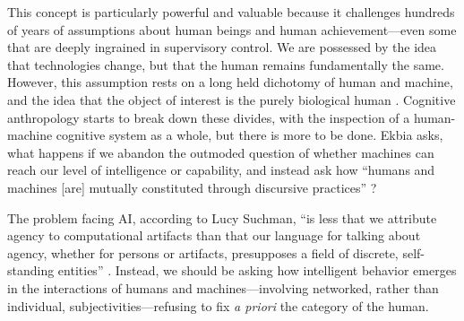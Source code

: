 
This concept is particularly powerful and valuable because it
challenges hundreds of years of assumptions about human beings and
human achievement---even some that are deeply ingrained in supervisory
control. We are
possessed by the idea that technologies change, but that the human
remains fundamentally the same. However, this assumption rests on a long held 
dichotomy of human and machine, and the idea that the object of
interest is the purely biological human \cite[p. 327, 331]{ekbia}. Cognitive
anthropology starts to break down these 
divides, with the inspection of a human-machine cognitive system as a
whole, but there is more to be done. Ekbia asks, what happens if we
abandon the outmoded question of whether machines can reach our level
of intelligence or capability, and instead ask how  ``humans and machines
[are] mutually constituted through discursive practices'' \cite[p.
  328]{ekbia}?



The problem facing AI, according to Lucy Suchman, ``is less that we attribute agency to
computational artifacts than that our language for talking about
agency, whether for persons or artifacts, presupposes a field of
discrete, self-standing entities'' \cite[p. 263]{SuchmanPlans}.
Instead, we should be asking how intelligent behavior emerges in
the interactions of
humans and machines---involving networked, rather than individual,
subjectivities---refusing to fix \emph{a priori} the category of 
the human.

